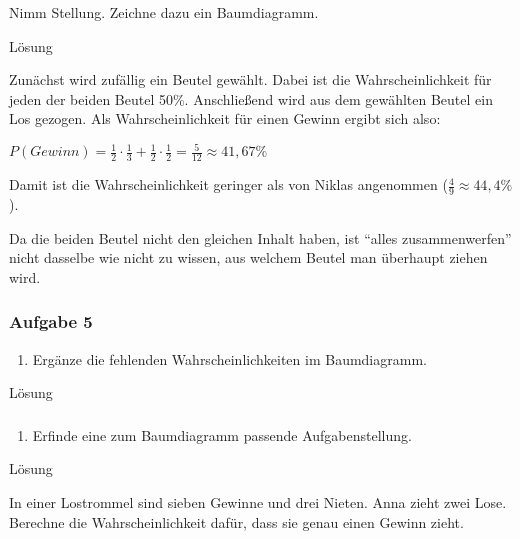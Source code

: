 \documentclass[
  ngerman,
]{book}
\providecommand{\tightlist}{%
  \setlength{\itemsep}{0pt}\setlength{\parskip}{0pt}}
\begin{document}
Nimm Stellung. Zeichne dazu ein Baumdiagramm.

Lösung

Zunächst wird zufällig ein Beutel gewählt. Dabei ist die Wahrscheinlichkeit für jeden der beiden Beutel 50\%. Anschließend wird aus dem gewählten Beutel ein Los gezogen. Als Wahrscheinlichkeit für einen Gewinn ergibt sich also:

\(P(Gewinn) = \frac{1}{2} \cdot \frac{1}{3} + \frac{1}{2} \cdot \frac{1}{2} = \frac{5}{12} \approx 41,67\%\)

Damit ist die Wahrscheinlichkeit geringer als von Niklas angenommen (\(\frac{4}{9} \approx 44,4\%\)).

Da die beiden Beutel nicht den gleichen Inhalt haben, ist ``alles zusammenwerfen'' nicht dasselbe wie nicht zu wissen, aus welchem Beutel man überhaupt ziehen wird.

\hypertarget{section-151}{%
\subsubsection*{}\label{section-151}}

\hypertarget{aufgabe-5-1}{%
\subsubsection*{Aufgabe 5}\label{aufgabe-5-1}}

\begin{enumerate}
\def\labelenumi{\alph{enumi})}
\tightlist
\item
  Ergänze die fehlenden Wahrscheinlichkeiten im Baumdiagramm.
\end{enumerate}

Lösung

\hypertarget{section-152}{%
\subsubsection*{}\label{section-152}}

\begin{enumerate}
\def\labelenumi{\alph{enumi})}
\setcounter{enumi}{1}
\tightlist
\item
  Erfinde eine zum Baumdiagramm passende Aufgabenstellung.
\end{enumerate}

Lösung

In einer Lostrommel sind sieben Gewinne und drei Nieten. Anna zieht zwei Lose. Berechne die Wahrscheinlichkeit dafür, dass sie genau einen Gewinn zieht.
\end{document}
